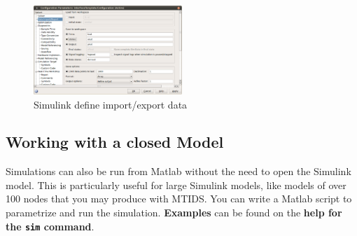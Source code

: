 \documentclass[a4paper,twoside, openright,12pt]{report}
\begin{document}
\begin{figure}[htb]
\centering
\includegraphics[width=0.5\textwidth]{pics/screenSim2.eps}
\caption[Simulink define import/export data]{Simulink define import/export data}
\label{simulink2Fig}
\end{figure} 

\subsection{Working with a closed Model}

Simulations can also be run from Matlab without the need to open the Simulink model. This is particularly useful for large Simulink models, like models of over 100 nodes that
you may produce with MTIDS. You can write a Matlab script to parametrize  and run the simulation. \textbf{Examples} can be found on the \textbf{help for the \texttt{sim} command}.
% 
% 
% 
% 
% 
% 
% 
% 
% 
\end{document}
